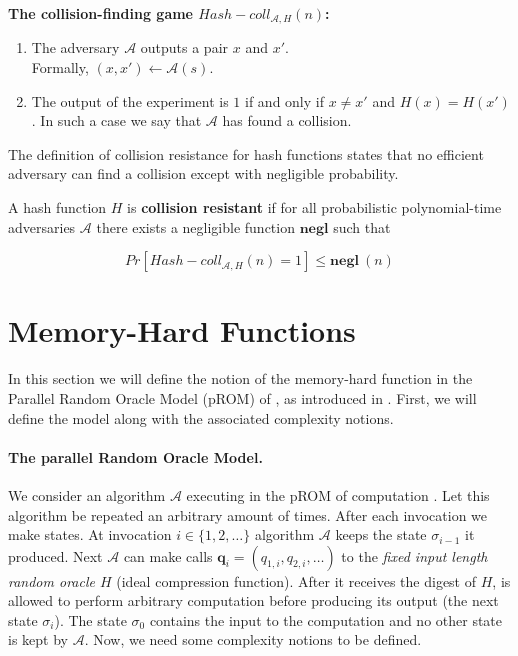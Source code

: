 \textbf{The collision-finding game ${Hash-coll}_{\mathcal{A},H}(n)$:} \cite{Katz:2007:IMC:1206501}
\begin{enumerate}
  \item The adversary $\mathcal{A}$ outputs a pair $x$ and $x'$. \\
  Formally, $(x,x') \leftarrow \mathcal{A}(s)$.
  \item The output of the experiment is $1$ if and only if $x \neq x'$ and $H(x) = H(x')$. In such a case we say that $\mathcal{A}$ has found a collision.
\end{enumerate}
%
The definition of collision resistance for hash functions states that no efficient adversary can find a collision except with negligible probability.
%
\begin{definition} \textnormal{\cite{Katz:2007:IMC:1206501}}
  A hash function $H$ is \textbf{collision resistant} if for all probabilistic polynomial-time adversaries $\mathcal{A}$ there exists a negligible function $\textbf{negl}$ such that

\begin{equation}\label{eqn:collision}
  Pr[{Hash-coll}_{\mathcal{A},H}(n) = 1] \leq \textbf{negl} \: (n)
\end{equation}
\end{definition}
%
\section{Memory-Hard Functions}
In this section we will define the notion of the memory-hard function in the Parallel Random Oracle Model (pROM) of \cite{Alwen:2015:HPC:2746539.2746622}, as introduced in \cite{cryptoeprint:2016:875}. First, we will define the model along with the associated complexity notions.

\paragraph{The parallel Random Oracle Model.} We consider an algorithm $\mathcal{A}$ executing in the pROM of computation \cite{Alwen:2015:HPC:2746539.2746622}. Let this algorithm be repeated an arbitrary amount of times. After each invocation we make states. At invocation $i \in \{ 1,2, \dots \}$ algorithm $\mathcal{A}$ keeps the state $\sigma_{i-1}$ it produced. Next $\mathcal{A}$ can make calls $\textbf{q}_i = (q_{1,i}, q_{2,i}, \dots)$
to the \textit{fixed input length random oracle $H$} (ideal compression function). After it receives the digest of $H$, is allowed to perform arbitrary computation before producing its output (the next state $\sigma_i$). The state $\sigma_0$ contains the input to the computation and no other state is kept by $\mathcal{A}$. Now, we need some complexity notions to be defined.

